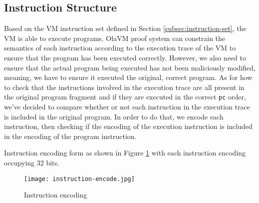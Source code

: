 \subsection{Instruction Structure} \label{subsec:instruction-structure}

Based on the VM instruction set defined in Section \ref{subsec:instruction-set}, the VM is able to execute programs. OlaVM proof system can constrain the semantics of each instruction according to the execution trace of the VM to ensure that the program has been executed correctly. However, we also need to ensure that the actual program being executed has not been maliciously modified, meaning, we have to ensure it executed the original, correct program. As for how to check that the instructions involved in the execution trace are all present in the original program fragment and if they are executed in the correct \verb|pc| order, we've decided to compare whether or not each instruction in the execution trace is included in the original program. In order to do that, we encode each instruction, then checking if the encoding of the execution instruction is included in the encoding of the program instruction.

Instruction encoding form as shown in Figure \ref{fig:instruction-encoding} with each instruction encoding occupying 32 bits.
\begin{figure}[!ht]
    \centering
    \texttt{[image: instruction-encode.jpg]}
    \caption{Instruction encoding}
    \label{fig:instruction-encoding}
\end{figure}

